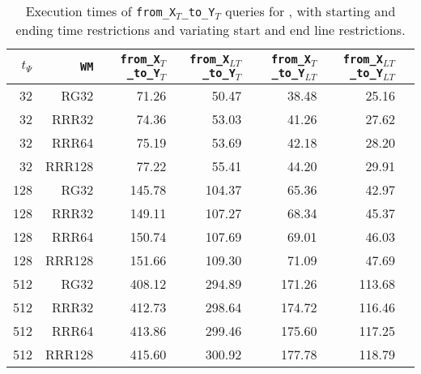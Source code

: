 \begin{table}[hbpt!]
\caption{Execution times of \texttt{from\_X$_T$\_to\_Y$_T$} queries for \ttctr, with starting and ending time restrictions and variating start and end line restrictions.}
\begin{tabular}{|r|r|r|r|r|r|r|}
\hline
$t_{\Psi}$ & \texttt{WM} & \texttt{from\_X$_{T}$\_to\_Y$_{T}$} & \texttt{from\_X$_{LT}$\_to\_Y$_{T}$} & \texttt{from\_X$_{T}$\_to\_Y$_{LT}$} & \texttt{from\_X$_{LT}$\_to\_Y$_{LT}$} \\
\hline
32 & RG32 & 71.26 & 50.47 & 38.48 & 25.16 \\
32 & RRR32 & 74.36 & 53.03 & 41.26 & 27.62 \\
32 & RRR64 & 75.19 & 53.69 & 42.18 & 28.20 \\
32 & RRR128 & 77.22 & 55.41 & 44.20 & 29.91 \\
128 & RG32 & 145.78 & 104.37 & 65.36 & 42.97 \\
128 & RRR32 & 149.11 & 107.27 & 68.34 & 45.37 \\
128 & RRR64 & 150.74 & 107.69 & 69.01 & 46.03 \\
128 & RRR128 & 151.66 & 109.30 & 71.09 & 47.69 \\
512 & RG32 & 408.12 & 294.89 & 171.26 & 113.68 \\
512 & RRR32 & 412.73 & 298.64 & 174.72 & 116.46 \\
512 & RRR64 & 413.86 & 299.46 & 175.60 & 117.25 \\
512 & RRR128 & 415.60 & 300.92 & 177.78 & 118.79 \\
\hline
\end{tabular}
\end{table}


